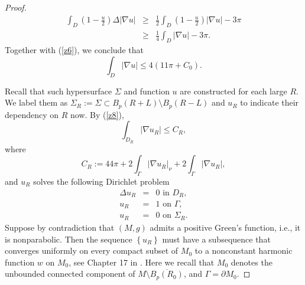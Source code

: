 \documentclass{amsart}
\numberwithin{equation}{section}
\begin{document}
\begin{proof}
\begin{eqnarray*}
\int_{D}\left( 1-\frac{u}{2}\right) \Delta \left\vert \nabla
u\right\vert  &\geq &\frac{1}{2}\int_{D}\left( 1-\frac{u}{2}\right)
\left\vert \nabla u\right\vert -3\pi \\
&\geq &\frac{1}{4}\int_{D}\left\vert \nabla u\right\vert -3\pi.
\end{eqnarray*}%
Together with (\ref{z6}), we conclude that
\begin{equation}
\int_{D}\left\vert \nabla u\right\vert \leq 4(11\pi +C_0).  \label{z8}
\end{equation}

Recall that such hypersurface $\Sigma$ and function $u$ are  constructed for each large $R.$
We label them as 
$\Sigma_{R}:=\Sigma \subset B_{p}\left( R+L\right) \setminus B_{p}\left( R-L\right)$ and $u_R$ to indicate
their dependency on $R$ now. By (\ref{z8}),
\begin{equation}\label{uR}
\int_{D_{R}}\left\vert \nabla u_{R}\right\vert \leq C_R,
\end{equation}
where 
$$
C_R:=44\pi +2 \int_{\Gamma }\left\vert \nabla
u_R\right\vert_\nu +2 \int_{\Gamma }\left\vert \nabla
u_R\right\vert,
$$ and $u_{R}$ solves the following Dirichlet problem  
\begin{eqnarray*}
\Delta u_{R} &=&0\text{ \ \ in } D_{R}, \\
u_{R} &=&1\text{ \ on }\Gamma , \\
u_{R} &=&0\text{ \ on }\Sigma _{R}.
\end{eqnarray*}%
Suppose by contradiction that $\left( M,g\right) $ admits a positive Green's function, i.e.,  it is nonparabolic. Then
the sequence $\left\{ u_{R}\right\} $ must have a subsequence that converges
uniformly on every compact subset of $M_0$ to a nonconstant harmonic function $w$ on 
$M_0$, see Chapter 17 in \cite{Li}. Here we recall that $M_0$ denotes the unbounded connected component of $M\setminus \overline{ B_p (R_0)}$, and $\Gamma=\partial M_0$.
 

\end{proof}
\end{document}
